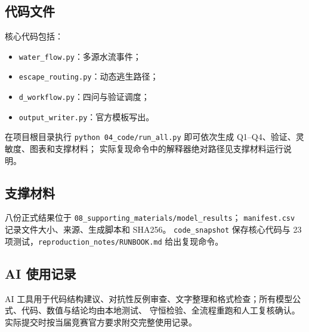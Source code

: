 \subsection{代码文件}
核心代码包括：
\begin{itemize}
  \item \texttt{water\_flow.py}：多源水流事件；
  \item \texttt{escape\_routing.py}：动态逃生路径；
  \item \texttt{d\_workflow.py}：四问与验证调度；
  \item \texttt{output\_writer.py}：官方模板写出。
\end{itemize}
在项目根目录执行
\texttt{python 04\_code/run\_all.py} 即可依次生成 Q1--Q4、验证、灵敏度、图表和支撑材料；
实际复现命令中的解释器绝对路径见支撑材料运行说明。

\subsection{支撑材料}
八份正式结果位于 \texttt{08\_supporting\_materials/model\_results}；
\texttt{manifest.csv} 记录文件大小、来源、生成脚本和 SHA256。
\texttt{code\_snapshot} 保存核心代码与 23 项测试，\texttt{reproduction\_notes/RUNBOOK.md} 给出复现命令。

\subsection{AI 使用记录}
AI 工具用于代码结构建议、对抗性反例审查、文字整理和格式检查；所有模型公式、代码、数值与结论均由本地测试、
守恒检验、全流程重跑和人工复核确认。实际提交时按当届竞赛官方要求附交完整使用记录。
